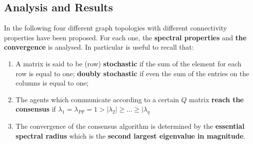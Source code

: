 \subsection*{Analysis and Results}
In the following four different graph topologies with different connectivity properties have been proposed. For each one, the \textbf{spectral properties} and \textbf{the convergence} is analysed. In particular is useful to recall that: 
\begin{enumerate}
    \itemsep-0.5em
    \item A matrix is said to be (row) \textbf{stochastic} if the sum of the element for each row is equal to one; \textbf{doubly stochastic} if even the sum of the entries on the columns is equal to one; 
    \item The agents which communicate according to a certain $Q$ matrix \textbf{reach the consensus} if {$\lambda_1=\lambda_{PF}=1>\vert \lambda_2 \vert \ge ... \ge \vert \lambda_q$} 
    \item The convergence of the consensus algorithm is determined by the \textbf{essential spectral radius} which is the \textbf{second largest eigenvalue in magnitude}.  
\end{enumerate}

